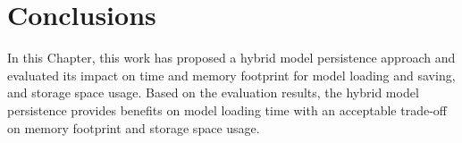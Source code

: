 \section{Conclusions}
\label{sec:conclusions_5}
In this Chapter, this work has proposed a hybrid model persistence approach and evaluated its impact on time and memory footprint for model loading and saving, and storage space usage.
Based on the evaluation results, the hybrid model persistence provides benefits on model loading time 
with an acceptable trade-off on memory footprint and storage space usage. 